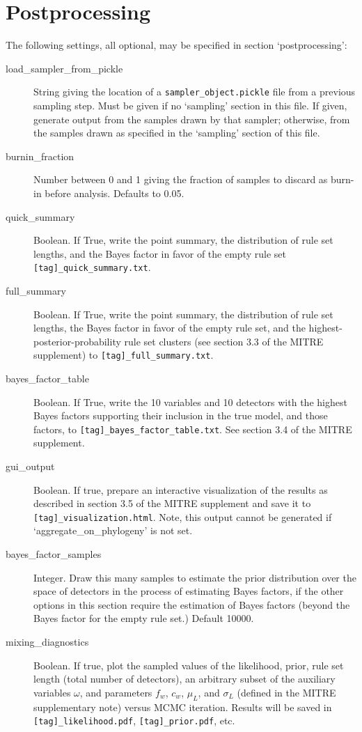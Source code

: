 \documentclass[12pt]{report}
\begin{document}
\section{Postprocessing}\label{postprocessing}
The following settings, all optional, may be specified in section `postprocessing':
\begin{description}
  \item[load\_sampler\_from\_pickle] String giving the location of a
    \texttt{sampler\_object.pickle} file from a previous sampling
    step. Must be given if no `sampling' section in this file. If
    given, generate output from the samples drawn by that sampler;
    otherwise, from the samples drawn as specified in the `sampling'
    section of this file.
  \item[burnin\_fraction] Number between 0 and 1 giving the fraction of
    samples to discard as burn-in before analysis. Defaults to 0.05. 
  \item[quick\_summary] Boolean. If True, write the point summary,
    the distribution of rule set lengths, and the Bayes factor in
    favor of the empty rule set 
    \texttt{[tag]\_quick\_summary.txt}.
  \item[full\_summary] Boolean. If True, write the point summary,
    the distribution of rule set lengths, the Bayes factor in
    favor of the empty rule set, and the highest-posterior-probability
    rule set clusters (see section 3.3 of the MITRE supplement) to 
    \texttt{[tag]\_full\_summary.txt}.
  \item[bayes\_factor\_table] Boolean. If True, write the 10 variables
    and 10 detectors with the highest Bayes factors supporting their
    inclusion in the true model, and those factors, to
    \texttt{[tag]\_bayes\_factor\_table.txt}. See section 3.4 of the
    MITRE supplement.
  \item[gui\_output] Boolean. If true, prepare an interactive
    visualization of the results as described in section 3.5 of the
    MITRE supplement and save it to
    \texttt{[tag]\_visualization.html}. Note, this output cannot be
    generated if `aggregate\_on\_phylogeny' is not set.
  \item[bayes\_factor\_samples] Integer. Draw this many samples
    to estimate the prior distribution over the space of detectors in the
    process of estimating Bayes factors, if the other options in this
    section require the estimation of Bayes factors (beyond the
    Bayes factor for the empty rule set.) Default 10000.
  \item[mixing\_diagnostics] Boolean. If true, plot the sampled values
    of the likelihood, prior, rule set length (total number of
    detectors), an arbitrary subset of the auxiliary variables
    $\omega$, and parameters $f_w$, $c_w$, $\mu_L$, and $\sigma_L$
    (defined in the MITRE supplementary note) versus MCMC
    iteration. Results will be saved in
    \texttt{[tag]\_likelihood.pdf}, \texttt{[tag]\_prior.pdf}, etc.
    
\end{description}
\end{document}
